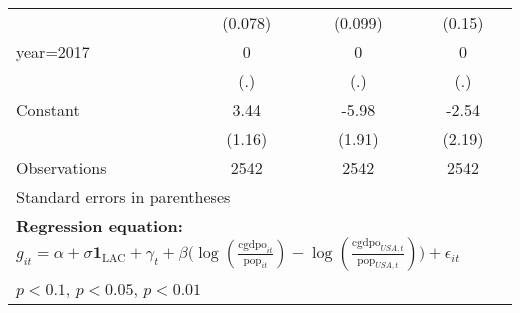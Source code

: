 \begin{sidewaystable}[htbp]
\begin{tabular}{l*{3}{c}}
                &  (0.078)         &  (0.099)         &   (0.15)         \\
\addlinespace
year=2017       &        0         &        0         &        0         \\
                &      (.)         &      (.)         &      (.)         \\
\addlinespace
Constant        &     3.44\sym{***}&    -5.98\sym{***}&    -2.54         \\
                &   (1.16)         &   (1.91)         &   (2.19)         \\
\midrule
Observations    &     2542         &     2542         &     2542         \\
\bottomrule
\multicolumn{4}{l}{\footnotesize Standard errors in parentheses}\\
\multicolumn{4}{l}{\footnotesize \textbf{Regression equation:} \(g_{it} = \alpha + \sigma \mathbf{1}_{\textrm{LAC}} + \gamma_t + \beta \big(\log (\frac{\textrm{cgdpo}_{it}}{\textrm{pop}_{it}} ) - \log (\frac{\textrm{cgdpo}_{USA,t}}{\textrm{pop}_{USA,t}}  ) \big) + \epsilon_{it}\)}\\
\multicolumn{4}{l}{\footnotesize \sym{*} \(p<0.1\), \sym{**} \(p<0.05\), \sym{***} \(p<0.01\)}\\
\end{tabular}
\end{sidewaystable}
